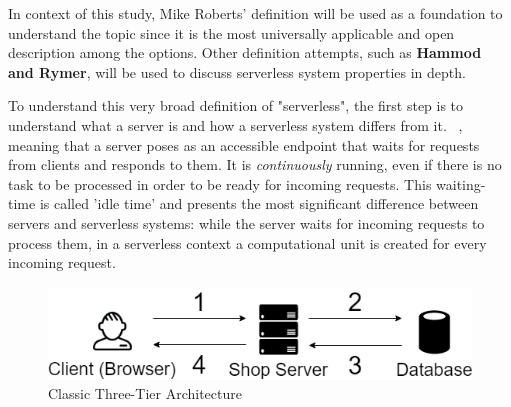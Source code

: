 In context of this study, Mike Roberts' definition will be used as a foundation to understand the topic since it is the most universally applicable and open description among the options. Other definition attempts, such as \textbf{Hammod and Rymer}, will be used to discuss serverless system properties in depth.

To understand this very broad definition of "serverless", the first step is to understand what a server is and how a serverless system differs from it. ~\autocite{Mitchell.Bradley2018TheServer}, meaning that a server poses as an accessible endpoint that waits for requests from clients and responds to them. It is \textit{continuously} running, even if there is no task to be processed in order to be ready for incoming requests. This waiting-time is called 'idle time' and presents the most significant difference between servers and serverless systems: while the server waits for incoming requests to process them, in a serverless context a computational unit is created for every incoming request.

\begin{figure}[ht]
    \includegraphics[width=0.9\linewidth]{images/drawio/3tier-oneclient.png}\centering
    \caption {Classic Three-Tier Architecture}
    \label{fig:3tier1client}
\end{figure}

